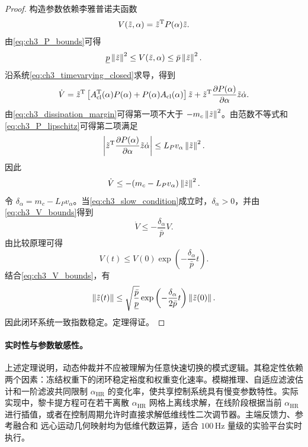 \begin{proof}
构造参数依赖李雅普诺夫函数
\begin{equation}
  V(\tilde z,\alpha)=\tilde z^{\mathrm{T}}P(\alpha)\tilde z .
\end{equation}
由\eqref{eq:ch3_P_bounds}可得
\begin{equation}
  \underline p\left\lVert \tilde z\right\rVert^2\le V(\tilde z,\alpha)\le \bar p\left\lVert \tilde z\right\rVert^2 .
  \label{eq:ch3_V_bounds}
\end{equation}
沿系统\eqref{eq:ch3_timevarying_closed}求导，得到
\begin{equation}
  \dot V=\tilde z^{\mathrm{T}}\left[A_{\mathrm{cl}}^{\mathrm{T}}(\alpha)P(\alpha)+P(\alpha)A_{\mathrm{cl}}(\alpha)\right]\tilde z+\tilde z^{\mathrm{T}}\frac{\partial P(\alpha)}{\partial\alpha}\tilde z\dot\alpha .
\end{equation}
由\eqref{eq:ch3_dissipation_margin}可得第一项不大于 $-m_c\left\lVert \tilde z\right\rVert^2$。由范数不等式和\eqref{eq:ch3_P_lipschitz}可得第二项满足
\begin{equation}
  \left|\tilde z^{\mathrm{T}}\frac{\partial P(\alpha)}{\partial\alpha}\tilde z\dot\alpha\right|\le L_Pv_\alpha\left\lVert \tilde z\right\rVert^2 .
\end{equation}
因此
\begin{equation}
  \dot V\le -(m_c-L_Pv_\alpha)\left\lVert \tilde z\right\rVert^2 .
\end{equation}
令 $\delta_\alpha=m_c-L_Pv_\alpha$。当\eqref{eq:ch3_slow_condition}成立时，$\delta_\alpha>0$，并由\eqref{eq:ch3_V_bounds}得到
\begin{equation}
  \dot V\le -\frac{\delta_\alpha}{\bar p}V .
\end{equation}
由比较原理可得
\begin{equation}
  V(t)\le V(0)\exp\left(-\frac{\delta_\alpha}{\bar p}t\right).
\end{equation}
结合\eqref{eq:ch3_V_bounds}，有
\begin{equation}
  \left\lVert \tilde z(t)\right\rVert\le \sqrt{\frac{\bar p}{\underline p}}\exp\left(-\frac{\delta_\alpha}{2\bar p}t\right)\left\lVert \tilde z(0)\right\rVert .
\end{equation}
因此闭环系统一致指数稳定。定理得证。
\end{proof}

\paragraph{实时性与参数敏感性。}
\label{subsec:ch3_realtime}

上述定理说明，动态仲裁并不应被理解为任意快速切换的模式逻辑。其稳定性依赖两个因素：冻结权重下的闭环稳定裕度和权重变化速率。模糊推理、自适应滤波估计和一阶滤波共同限制 $\alpha_{\mathrm{HR}}$ 的变化率，使共享控制系统具有慢变参数特性。实际实现中，黎卡提方程可在若干离散 $\alpha_{\mathrm{HR}}$ 网格上离线求解，在线阶段根据当前 $\alpha_{\mathrm{HR}}$ 进行插值，或者在控制周期允许时直接求解低维线性二次调节器。主端反馈力、参考融合和 远心运动几何映射均为低维代数运算，适合 $100\,\mathrm{Hz}$ 量级的实验平台实时执行。

